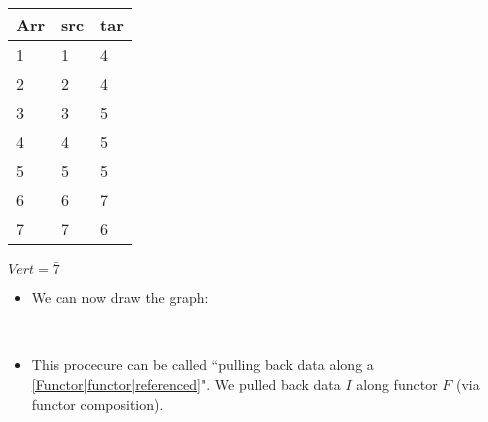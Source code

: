   \begin{minipage}{0.48\textwidth}

    \begin{tabular}{|l|l|l|}
      \hline
      Arr & src & tar \\ \hline
      1   & 1   & 4   \\ \hline
      2   & 2   & 4   \\ \hline
      3   & 3   & 5   \\ \hline
      4   & 4   & 5   \\ \hline
      5   & 5   & 5   \\ \hline
      6   & 6   & 7   \\ \hline
      7   & 7   & 6   \\ \hline
    \end{tabular}
  \end{minipage}
  $Vert = \bar{7}$

  \begin{itemize}
    \item  We can now draw the graph: \,\,
    \item This procecure can be called ``pulling back data along a \ref{Functor|functor|referenced}". We pulled back data $I$ along functor $F$ (via functor composition).

  \end{itemize}
